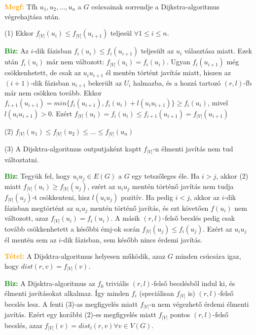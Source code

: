 \documentclass[../../szobeli.tex]{subfiles}
\begin{document}
\begin{itemize}
            \textcolor{orange}{\textbf{Megf:}} Tfh $u_1, u_2, \dots, u_n$ a $G$ csúcsainak sorrendje a Dijkstra-algoritmus végrehajtása után. 

            (1) Ekkor $f_{|V|}(u_i) \leq f_{|V|}(u_{i+1})$ teljesül $\forall 1 \leq i \leq n$.

            \textcolor{green}{\textbf{Biz:}} Az $i$-dik fázisban $f_i(u_i) \leq f_i(u_{i+1})$ teljesült az $u_i$ választása miatt. Ezek után $f_i(u_i)$ már nem változott: $f_{|V|}(u_i) = f_i(u_i)$. Ugyan $f_i(u_{i+1})$ még csökkenhetett, de csak az $u_iu_{i+1}$ él mentén történt javítás miatt, hiszen az $(i+1)$-dik fázisban $u_{i+1}$ bekerült az $U_i$ halmazba, és a hozzá tartozó $(r,l)$-fb már nem csökken tovább. Ekkor $f_{i+1}(u_{i+1}) = min \{f_i(u_{i+1}),f_i(u_i)+l(u_iu_{i+1})\} \geq f_i(u_i)$, mivel $l(u_iu_{i+1}) > 0$. Ezért $f_{|V|}(u_i) = f_i(u_i) \leq f_{i+1}(u_{i+1}) = f_{|V|}(u_{i+1})$  

            (2) $f_{|V|}(u_1) \leq f_{|V|}(u_2) \leq \dots \leq f_{|V|}(u_n)$

            (3) A Dijsktra-algoritmus outputjaként kaptt $f_{|V|}$-n élmenti javítás nem tud változtatni.

            \textcolor{green}{\textbf{Biz:}} Tegyük fel, hogy $u_iu_j \in E(G)$ a $G$ egy tetszőleges éle. Ha $i > j$, akkor (2) miatt $f_{|V|}(u_i) \geq f_{|V|}(u_j)$, ezért az $u_iu_j$ mentén történő javítás nem tudja $f_{|V|}(u_j)$-t csökkenteni, hisz $l(u_iu_j)$ pozitív. Ha pedig $i < j$, akkor az $i$-dik fázisban megtörtént az $u_iu_j$ mentén történő javítás, és ezt követően $f(u_i)$  nem változott, azaz $f_{|V|}(u_i) = f_i(u_i)$. A másik $(r,l)$-felső becslés pedig csak tovább csökkenhetett a későbbi émj-ok során $f_{|V|}(u_j) \leq f_i(u_j)$. Ezért az $u_iu_j$ él mentén sem az $i$-dik fázisban, sem később nincs érdemi javítás.  

            \textcolor{orange}{\textbf{Tétel:}} A Dijsktra-algoritmus helyesen működik, azaz $G$ minden csúcsára igaz, hogy $dist(r,v) = f_{|V|}(v)$.

            \textcolor{green}{\textbf{Biz:}} A Dijsktra-algoritmus az $f_0$ triviális $(r,l)$-felső becslésből indul ki, és élmenti javításokat alkalmaz. Így minden $f_i$ (speciálisan $f_{|V|}$ is) $(r,l)$-felső becslés lesz. A fenti (3)-as megfigyelés miatt $f_{|V|}$-n nem  végezhető érdemi élmenti javítás. Ezért egy korábbi (2)-es megfigyelés miatt $f_{|V|}$ pontos $(r,l)$-felső becslés, azaz $f_{|V|}(v) = dist_l(r,v) \forall v \in V(G)$.  
            

\end{itemize}
\end{document}
